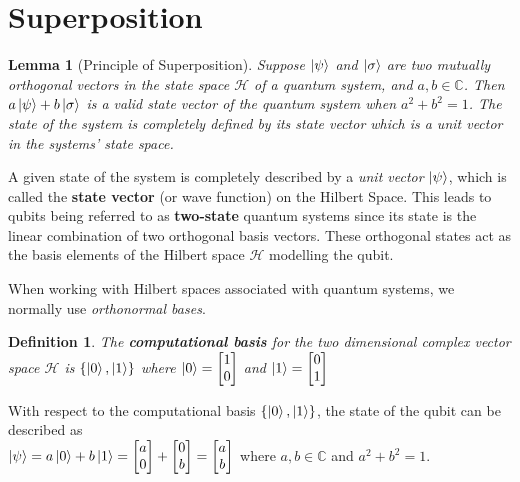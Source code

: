 \documentclass[12pt,twoside]{report}
\theoremstyle{thmstyle}
\newtheorem{defn}[subsection]{Definition}
\newtheorem{lemma}[subsection]{Lemma}
\begin{document}
\section{Superposition}

\begin{lemma}[Principle of Superposition]
    Suppose $\ket{\psi}$ and $\ket{\sigma}$ are two mutually orthogonal vectors in the state space $\mathcal{H}$ of a quantum system, and $a, b \in \mathbb{C}$. Then $a \ket{\psi} + b \ket{\sigma}$ is a valid state vector of the quantum system when $a^2 + b^2 = 1$. The state of the system is completely defined by its state vector which is a unit vector in the systems' state space.
\end{lemma}

A given state of the system is completely described by a \textit{unit vector} $\ket{\psi}$, which is called the \textbf{state vector} (or wave function) on the Hilbert Space. This leads to qubits being referred to as \textbf{two-state} quantum systems since its state is the linear combination of two orthogonal basis vectors. These orthogonal states act as the basis elements of the Hilbert space $\mathcal{H}$ modelling the qubit.

\vspace*{0.75cm}
When working with Hilbert spaces associated with quantum systems, we normally use \textit{orthonormal bases}.
\begin{defn}
The \textbf{computational basis} for the two dimensional complex vector space $\mathcal{H}$ is $\{ \ket{0}, \ket{1} \}$ where $\ket{0} = \begin{bmatrix} 1 \\ 0 \end{bmatrix}$ and $\ket{1} = \begin{bmatrix} 0 \\ 1 \end{bmatrix}$
\end{defn}

With respect to the computational basis $\{ \ket{0}, \ket{1} \}$, the state of the qubit can be described as \\ $\ket{\psi} = a \ket{0} + b \ket{1} = \begin{bmatrix} a \\ 0 \end{bmatrix} + \begin{bmatrix} 0 \\ b \end{bmatrix} = \begin{bmatrix} a \\ b \end{bmatrix} $ where $a, b \in \mathbb{C}$ and $a^2 + b^2 = 1$.
\end{document}
